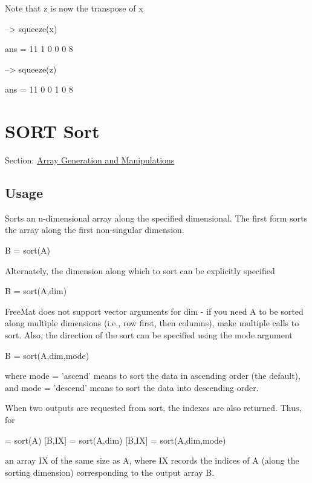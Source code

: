 Note that {\ttfamily z} is now the transpose of {\ttfamily x}


\begin{DoxyVerbInclude}
--> squeeze(x)

ans = 
 11  1 
  0  0 
  0  8 

--> squeeze(z)

ans = 
 11  0  0 
  1  0  8 
\end{DoxyVerbInclude}
 \hypertarget{array_sort}{}\section{S\-O\-R\-T Sort}\label{array_sort}
Section\-: \hyperlink{sec_array}{Array Generation and Manipulations} \hypertarget{vtkwidgets_vtkxyplotwidget_Usage}{}\subsection{Usage}\label{vtkwidgets_vtkxyplotwidget_Usage}
Sorts an n-\/dimensional array along the specified dimensional. The first form sorts the array along the first non-\/singular dimension. \begin{DoxyVerb}  B = sort(A)
\end{DoxyVerb}
 Alternately, the dimension along which to sort can be explicitly specified \begin{DoxyVerb}  B = sort(A,dim)
\end{DoxyVerb}
 Free\-Mat does not support vector arguments for {\ttfamily dim} -\/ if you need {\ttfamily A} to be sorted along multiple dimensions (i.\-e., row first, then columns), make multiple calls to {\ttfamily sort}. Also, the direction of the sort can be specified using the {\ttfamily mode} argument \begin{DoxyVerb}  B = sort(A,dim,mode)
\end{DoxyVerb}
 where {\ttfamily mode = 'ascend'} means to sort the data in ascending order (the default), and {\ttfamily mode = 'descend'} means to sort the data into descending order.

When two outputs are requested from {\ttfamily sort}, the indexes are also returned. Thus, for \begin{DoxyVerb}  [B,IX] = sort(A)
  [B,IX] = sort(A,dim)
  [B,IX] = sort(A,dim,mode)
\end{DoxyVerb}
 an array {\ttfamily I\-X} of the same size as {\ttfamily A}, where {\ttfamily I\-X} records the indices of {\ttfamily A} (along the sorting dimension) corresponding to the output array {\ttfamily B}.

